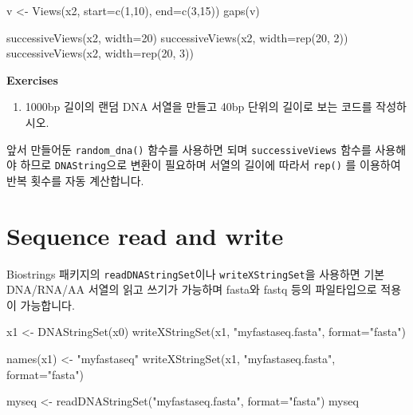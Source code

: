 \documentclass[
  a4paper,
]{book}
\newenvironment{Shaded}{\begin{snugshade}}{\end{snugshade}}
\newcommand{\AttributeTok}[1]{\textcolor[rgb]{0.40,0.45,0.13}{#1}}
\newcommand{\DecValTok}[1]{\textcolor[rgb]{0.68,0.00,0.00}{#1}}
\newcommand{\FunctionTok}[1]{\textcolor[rgb]{0.28,0.35,0.67}{#1}}
\newcommand{\NormalTok}[1]{\textcolor[rgb]{0.00,0.23,0.31}{#1}}
\newcommand{\OtherTok}[1]{\textcolor[rgb]{0.00,0.23,0.31}{#1}}
\newcommand{\StringTok}[1]{\textcolor[rgb]{0.13,0.47,0.30}{#1}}
\providecommand{\tightlist}{%
  \setlength{\itemsep}{0pt}\setlength{\parskip}{0pt}}\usepackage{longtable,booktabs,array}
\begin{document}
\begin{Shaded}
\begin{Highlighting}[]
\NormalTok{v }\OtherTok{\textless{}{-}} \FunctionTok{Views}\NormalTok{(x2, }\AttributeTok{start=}\FunctionTok{c}\NormalTok{(}\DecValTok{1}\NormalTok{,}\DecValTok{10}\NormalTok{), }\AttributeTok{end=}\FunctionTok{c}\NormalTok{(}\DecValTok{3}\NormalTok{,}\DecValTok{15}\NormalTok{))}
\FunctionTok{gaps}\NormalTok{(v)}

\FunctionTok{successiveViews}\NormalTok{(x2, }\AttributeTok{width=}\DecValTok{20}\NormalTok{)}
\FunctionTok{successiveViews}\NormalTok{(x2, }\AttributeTok{width=}\FunctionTok{rep}\NormalTok{(}\DecValTok{20}\NormalTok{, }\DecValTok{2}\NormalTok{))}
\FunctionTok{successiveViews}\NormalTok{(x2, }\AttributeTok{width=}\FunctionTok{rep}\NormalTok{(}\DecValTok{20}\NormalTok{, }\DecValTok{3}\NormalTok{))}
\end{Highlighting}
\end{Shaded}

\textbf{Exercises}

\begin{enumerate}
\def\labelenumi{\arabic{enumi})}
\tightlist
\item
  1000bp 길이의 랜덤 DNA 서열을 만들고 40bp 단위의 길이로 보는 코드를
  작성하시오.
\end{enumerate}

앞서 만들어둔 \texttt{random\_dna()} 함수를 사용하면 되며
\texttt{successiveViews} 함수를 사용해야 하므로 \texttt{DNAString}으로
변환이 필요하며 서열의 길이에 따라서 \texttt{rep()} 를 이용하여 반복
횟수를 자동 계산합니다.

\hypertarget{sequence-read-and-write}{%
\section{Sequence read and write}\label{sequence-read-and-write}}

Biostrings 패키지의 \texttt{readDNAStringSet}이나
\texttt{writeXStringSet}을 사용하면 기본 DNA/RNA/AA 서열의 읽고 쓰기가
가능하며 fasta와 fastq 등의 파일타입으로 적용이 가능합니다.

\begin{Shaded}
\begin{Highlighting}[]
\NormalTok{x1 }\OtherTok{\textless{}{-}} \FunctionTok{DNAStringSet}\NormalTok{(x0)}
\FunctionTok{writeXStringSet}\NormalTok{(x1, }\StringTok{"myfastaseq.fasta"}\NormalTok{, }\AttributeTok{format=}\StringTok{"fasta"}\NormalTok{)}

\FunctionTok{names}\NormalTok{(x1) }\OtherTok{\textless{}{-}} \StringTok{"myfastaseq"}
\FunctionTok{writeXStringSet}\NormalTok{(x1, }\StringTok{"myfastaseq.fasta"}\NormalTok{, }\AttributeTok{format=}\StringTok{"fasta"}\NormalTok{)}

\NormalTok{myseq }\OtherTok{\textless{}{-}} \FunctionTok{readDNAStringSet}\NormalTok{(}\StringTok{"myfastaseq.fasta"}\NormalTok{, }\AttributeTok{format=}\StringTok{"fasta"}\NormalTok{)}
\NormalTok{myseq}
\end{Highlighting}
\end{Shaded}
\end{document}
